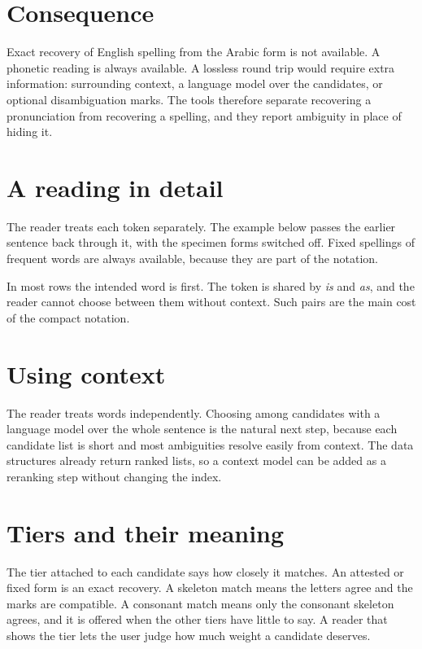\begin{table}[ht]\centering\small

\caption{Largest classes of words that share an unmarked spelling.}\label{tab:coll}
\end{table}

\section{Consequence}
Exact recovery of English spelling from the Arabic form is not available. A phonetic reading is always available. A lossless round trip would require extra information: surrounding context, a language model over the candidates, or optional disambiguation marks. The tools therefore separate recovering a pronunciation from recovering a spelling, and they report ambiguity in place of hiding it.

\section{A reading in detail}
The reader treats each token separately. The example below passes the earlier sentence back through it, with the specimen forms switched off. Fixed spellings of frequent words are always available, because they are part of the notation.

\begin{table}[ht]\centering\small

\caption{Reader output for one sentence: the first four candidates for each token.}\label{tab:readerdemo}
\end{table}

In most rows the intended word is first. The token  is shared by \emph{is} and \emph{as}, and the reader cannot choose between them without context. Such pairs are the main cost of the compact notation.

\section{Using context}
The reader treats words independently. Choosing among candidates with a language model over the whole sentence is the natural next step, because each candidate list is short and most ambiguities resolve easily from context. The data structures already return ranked lists, so a context model can be added as a reranking step without changing the index.

\section{Tiers and their meaning}
The tier attached to each candidate says how closely it matches. An attested or fixed form is an exact recovery. A skeleton match means the letters agree and the marks are compatible. A consonant match means only the consonant skeleton agrees, and it is offered when the other tiers have little to say. A reader that shows the tier lets the user judge how much weight a candidate deserves.
